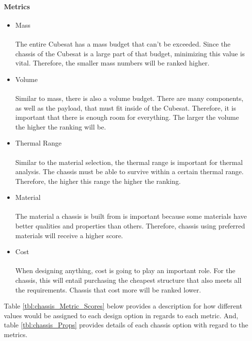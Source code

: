 \paragraph{Metrics}
\begin{itemize}
\item{Mass}\\
\\
The entire Cubesat has a mass budget that can't be exceeded. Since the chassis of the Cubesat is a large part of that budget, minimizing this value is vital. Therefore, the smaller mass numbers will be ranked higher. 
\\
\item{Volume}\\
\\
Similar to mass, there is also a volume budget. There are many components, as well as the payload, that must fit inside of the Cubesat. Therefore, it is important that there is enough room for everything. The larger the volume the higher the ranking will be.
\\
\item{Thermal Range}\\
\\
Similar to the material selection, the thermal range is important for thermal analysis. The chassis must be able to survive within a certain thermal range. Therefore, the higher this range the higher the ranking.
\\
\item{Material}\\
\\
The material a chassis is built from is important because some materials have better qualities and properties than others. Therefore, chassis using preferred materials will receive a higher score. 
\\
\item{Cost}\\
\\
When designing anything, cost is going to play an important role. For the chassis, this will entail purchasing the cheapest structure that also meets all the requirements. Chassis that cost more will be ranked lower.
\end{itemize}

Table \ref{tbl:chassis_Metric_Scores} below provides a description for how different values would be assigned to each design option in regards to each metric. And, table \ref{tbl:chassis_Props} provides details of each chassis option with regard to the metrics.

